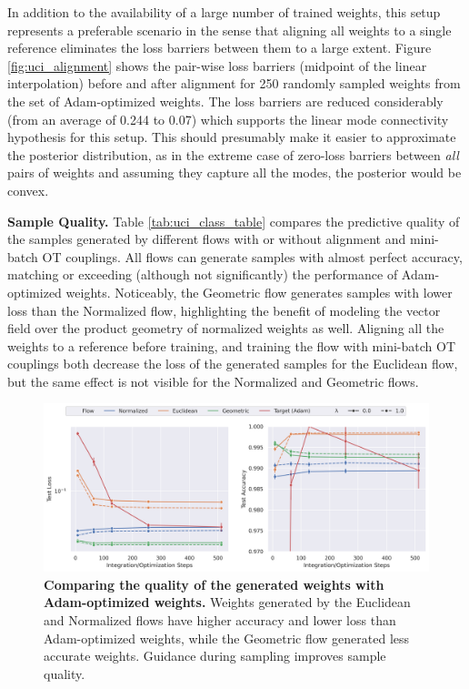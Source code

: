 In addition to the availability of a large number of trained weights, this setup represents a preferable scenario in the sense that aligning all weights to a single reference eliminates the loss barriers between them to a large extent. Figure \ref{fig:uci_alignment} shows the pair-wise loss barriers (midpoint of the linear interpolation) before and after alignment for 250 randomly sampled weights from the set of Adam-optimized weights. The loss barriers are reduced considerably (from an average of 0.244 to 0.07) which supports the linear mode connectivity hypothesis for this setup. This should presumably make it easier to approximate the posterior distribution, as in the extreme case of zero-loss barriers between \textit{all} pairs of weights and assuming they capture all the modes, the posterior would be convex. 

\textbf{Sample Quality.} Table \ref{tab:uci_class_table} compares the predictive quality of the samples generated by different flows with or without alignment and mini-batch OT couplings. All flows can generate samples with almost perfect accuracy, matching or exceeding (although not significantly) the performance of Adam-optimized weights. Noticeably, the Geometric flow generates samples with lower loss than the Normalized flow, highlighting the benefit of modeling the vector field over the product geometry of normalized weights as well. Aligning all the weights to a reference before training, and training the flow with mini-batch OT couplings both decrease the loss of the generated samples for the Euclidean flow, but the same effect is not visible for the Normalized and Geometric flows. 

\begin{figure}[t!]
    \centering
    \includegraphics[width=\linewidth]{figures/uci_17/uci_17_steps_both.png}
    \caption{\label{fig:uci_steps}\textbf{Comparing the quality of the generated weights with Adam-optimized weights.} Weights generated by the Euclidean and Normalized flows have higher accuracy and lower loss than Adam-optimized weights, while the Geometric flow generated less accurate weights. Guidance during sampling improves sample quality.} 
\end{figure}


